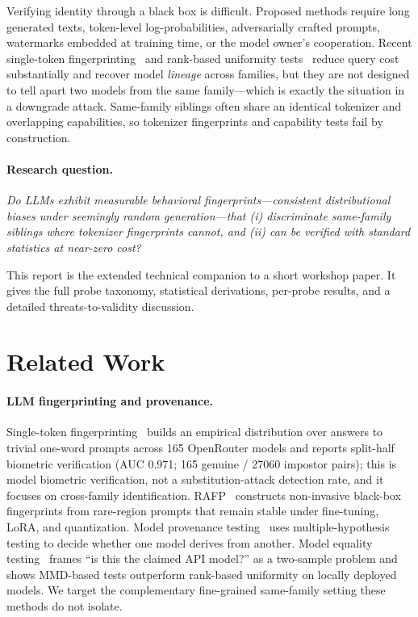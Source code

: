 \documentclass[11pt]{article}
\begin{document}
Verifying identity through a black box is difficult. Proposed methods require long generated texts, token-level log-probabilities, adversarially crafted prompts, watermarks embedded at training time, or the model owner's cooperation. Recent single-token fingerprinting~\cite{bruckner2026token} and rank-based uniformity tests~\cite{zhu2025rank} reduce query cost substantially and recover model \emph{lineage} across families, but they are not designed to tell apart two models from the same family---which is exactly the situation in a downgrade attack. Same-family siblings often share an identical tokenizer and overlapping capabilities, so tokenizer fingerprints and capability tests fail by construction.

\paragraph{Research question.}
\emph{Do LLMs exhibit measurable behavioral fingerprints---consistent distributional biases under seemingly random generation---that (i) discriminate same-family siblings where tokenizer fingerprints cannot, and (ii) can be verified with standard statistics at near-zero cost?}

This report is the extended technical companion to a short workshop paper. It gives the full probe taxonomy, statistical derivations, per-probe results, and a detailed threats-to-validity discussion.

\section{Related Work}
\label{sec:related}

\paragraph{LLM fingerprinting and provenance.}
Single-token fingerprinting~\cite{bruckner2026token} builds an empirical distribution over answers to trivial one-word prompts across 165 OpenRouter models and reports split-half biometric verification (AUC 0.971; 165 genuine / 27060 impostor pairs); this is model biometric verification, not a substitution-attack detection rate, and it focuses on cross-family identification. RAFP~\cite{tsai2025rofl} constructs non-invasive black-box fingerprints from rare-region prompts that remain stable under fine-tuning, LoRA, and quantization. Model provenance testing~\cite{nikolic2025provenance} uses multiple-hypothesis testing to decide whether one model derives from another. Model equality testing~\cite{met2025} frames ``is this the claimed API model?'' as a two-sample problem and shows MMD-based tests outperform rank-based uniformity on locally deployed models. We target the complementary fine-grained same-family setting these methods do not isolate.
\end{document}
